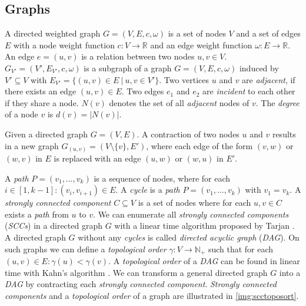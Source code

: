 \subsection{Graphs}
%
A directed weighted graph $G = (V,E,c,\omega)$ is a set of nodes $V$ 
and a set of edges $E$ with a node weight function 
$c: V \rightarrow \mathbb{R}$ and an edge weight 
function $\omega: E \rightarrow \mathbb{R}$. An edge $e = (u,v)$ 
is a relation between two nodes $u,v \in V$.
$G_{V'} = (V',E_{V'},c,\omega)$ is a subgraph of a graph $G = (V,E,c,\omega)$
induced by $V' \subseteq V$ with $E_{V'} = \{(u,v) \in E\ |\ u,v \in V'\}$.
Two vertices $u$ and $v$ are \emph{adjacent}, if there exists an edge
$(u,v) \in E$. Two edges $e_1$ and $e_2$ are \emph{incident} to each other if they
share a node. $N(v)$ denotes the set of all \emph{adjacent} nodes of 
$v$. The \emph{degree} of a node $v$ is $d(v) = |N(v)|$.

\begin{definition}[Contraction]
Given a directed graph $G = (V,E)$. A contraction of two nodes
$u$ and $v$ results in a new graph $G_{(u,v)} = (V\setminus\{v\},E')$, where
each edge of the form $(v,w)$ or $(w,v)$ in $E$ is replaced with an edge 
$(u,w)$ or $(w,u)$ in $E'$.
\label{def:contraction}
\end{definition}

A \emph{path} $P = (v_1,\ldots,v_k)$ is a sequence of nodes, where for
each $i \in [1,k-1]: (v_i,v_{i+1}) \in E$. A \emph{cycle} is a \emph{path}
$P = (v_1,\ldots,v_k)$ with $v_1 = v_k$. A \emph{strongly connected 
component} $C \subseteq V$ is a set of nodes where for each $u,v \in C$
exists a \emph{path} from $u$ to $v$. We can enumerate all \emph{strongly
connected components} (\emph{SCCs}) in a directed graph $G$ with a linear time algorithm
proposed by Tarjan \cite{tarjan1972depth}. A directed graph $G$ without
any \emph{cycles} is called \emph{directed acyclic graph} (\emph{DAG}). On such
graphs we can define a \emph{topological order} $\gamma: V \rightarrow \mathbb{N}_+$ such
that for each $(u,v) \in E: \gamma(u) < \gamma(v)$. A \emph{topological order}
of a \emph{DAG} can be found in linear time with Kahn's algorithm \cite{kahn1962topological}.
We can transform a general directed graph $G$ into a \emph{DAG} by contracting
each \emph{strongly connected component}. \emph{Strongly connected components}
and a \emph{topological order} of a graph are illustrated in \autoref{img:scctoposort}.

